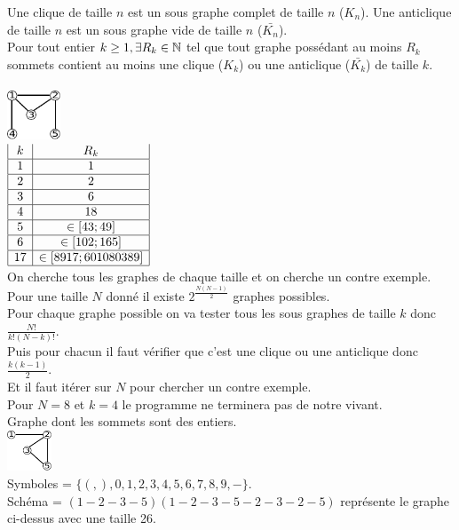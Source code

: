  Une clique de taille $n$ est un sous graphe complet de taille $n$ ($K_n$). Une anticlique de taille $n$ est un sous graphe vide de taille $n$ ($\bar{K_n}$). \\

 Pour tout entier $k \geq 1, \exists R_k \in \mathbb{N}$ tel que tout graphe possédant au moins $R_k$ sommets contient au moins une clique ($K_k$) ou une anticlique ($\bar{K_k}$) de taille $k$. \\

\\
\includegraphics[width=60px]{Images/01_exRamsey.pdf} \\
$\begin{array}{|c|c|}
	 k & R_k \\ \hline
	 1 & 1 \\ \hline
	 2 & 2 \\ \hline
	 3 & 6 \\ \hline
	 4 & 18 \\ \hline
	 5 & \in [43;49] \\ \hline
	 6 & \in [102;165] \\ \hline
	 17 & \in [8917;601080389] \\ \hline
\end{array}$
\\

 On cherche tous les graphes de chaque taille et on cherche un contre exemple. \\
Pour une taille $N$ donné il existe $2^{\frac{N(N-1)}{2}}$ graphes possibles. \\
Pour chaque graphe possible on va tester tous les sous graphes de taille $k$ donc $\frac{N!}{k!(N-k)!}$. \\
Puis pour chacun il faut vérifier que c'est une clique ou une anticlique donc $\frac{k(k-1)}{2}$. \\
Et il faut itérer sur $N$ pour chercher un contre exemple. \\
Pour $N = 8$ et $k = 4$ le programme ne terminera pas de notre vivant. \\

 Graphe dont les sommets sont des entiers. \\
\includegraphics[width=50px]{Images/02_exEncodage.pdf}\\
Symboles = $\{ (,),0,1,2,3,4,5,6,7,8,9,- \}$. \\
Schéma = $(1-2-3-5)(1-2-3-5-2-3-2-5)$ représente le graphe ci-dessus avec une taille 26.\\

